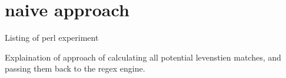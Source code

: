 \section{naive approach}

Listing of perl experiment

Explaination of approach of calculating all potential levenstien matches, and passing them back to the regex engine.
